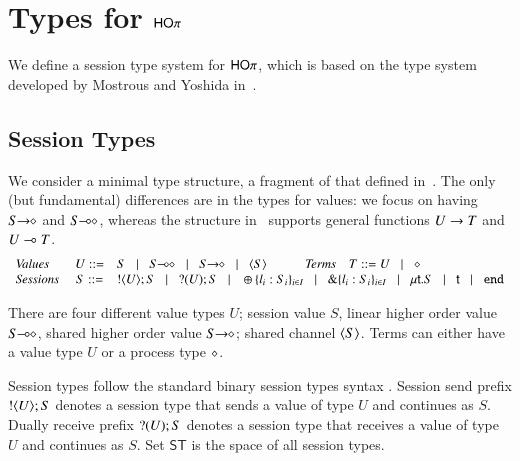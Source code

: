 \newcommand{\jrule}[3]{\displaystyle \trule{#3}~~\frac{#1 }{#2}}
\newcommand{\addenv}{\circ}

\section{Types for $\mathsf{HO}\pi$}

We define a session type system for $\mathsf{HO}\pi$, which is based on the type system developed by Mostrous
and Yoshida in~\cite{tlca07}.

\subsection{Session Types}
We consider a minimal type structure, a fragment of that defined in~\cite{tlca07}.
The only (but fundamental) differences are in the types for values: we focus on having 
$S\!\! \rightarrow\!\! \diamond$ and $S\!\! \multimap\!\! \diamond$, whereas the structure in~\cite{tlca07} supports general functions $U \rightarrow T$ and 
$U \multimap T$.
\[
	\begin{array}{lcl}
		\text{\emph{Values}} & U ::= & S \bnfbar \lhot{S} \bnfbar \shot{S} \bnfbar \chtype{S} \qquad \quad \text{\emph{Terms}} \quad T ::= U  \bnfbar  \Proc\\
		\text{\emph{Sessions}} \ & S ::= &  \btout{U} S \bnfbar \btinp{U} S
		\bnfbar		\btsel{l_i:S_i}_{i \in I} \bnfbar \btbra{l_i:S_i}_{i \in I} \bnfbar \trec{t}{S} \bnfbar \vart{t}  \bnfbar \tinact 
	\end{array}
\]

There are four different value types $U$; session value $S$, linear higher order value $S\!\! \multimap\!\! \diamond$, 
shared higher order value $S\!\! \rightarrow\!\! \diamond$; shared channel $\langle S \rangle$. Terms can either have a
value type $U$ or a process type $\diamond$.

Session types follow the standard binary session types syntax \cite{}. Session send prefix $! \langle U \rangle ; S$ 
denotes a session type that sends a value of type $U$ and continues as $S$. Dually receive prefix $? (U) ; S$
denotes a session type that receives a value of type $U$ and continues as $S$. 
Set $\mathsf{ST}$ is the space of all session types.

